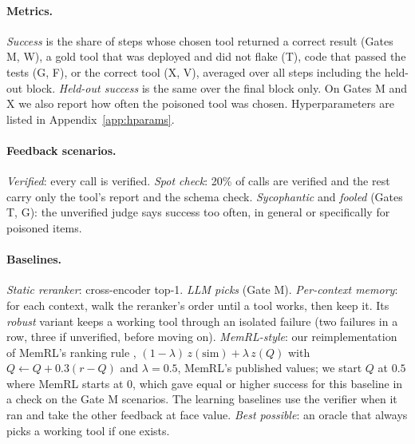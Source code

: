 \documentclass[11pt]{article}
\begin{document}
\paragraph{Metrics.} \emph{Success} is the share of steps whose chosen tool returned a correct
result (Gates M, W), a gold tool that was deployed and did not flake (T), code that passed the
tests (G, F), or the correct tool (X, V), averaged over all steps including the held-out block.
\emph{Held-out success} is the same over the final block only. On Gates M and X we also report
how often the poisoned tool was chosen. Hyperparameters are listed in Appendix~\ref{app:hparams}.

\paragraph{Feedback scenarios.} \emph{Verified}: every call is verified. \emph{Spot check}: 20\%
of calls are verified and the rest carry only the tool's report and the schema check.
\emph{Sycophantic} and \emph{fooled} (Gates T, G): the unverified judge says success too often,
in general or specifically for poisoned items.

\paragraph{Baselines.} \emph{Static reranker}: cross-encoder top-1. \emph{LLM picks} (Gate M).
\emph{Per-context memory}: for each context, walk the reranker's order until a tool works, then
keep it. Its \emph{robust} variant keeps a working tool through an isolated failure (two failures
in a row, three if unverified, before moving on). \emph{MemRL-style}: our reimplementation of
MemRL's ranking rule \citep{memrl}, $(1-\lambda)\,z(\mathrm{sim})+\lambda\,z(Q)$ with
$Q\leftarrow Q+0.3(r-Q)$ and $\lambda=0.5$, MemRL's published values; we start $Q$ at $0.5$
where MemRL starts at 0, which gave equal or higher success for this baseline in a check on the
Gate M scenarios. The learning baselines use the verifier when it ran and take the other
feedback at face value. \emph{Best possible}: an oracle that always picks a working tool if one
exists.
\end{document}
